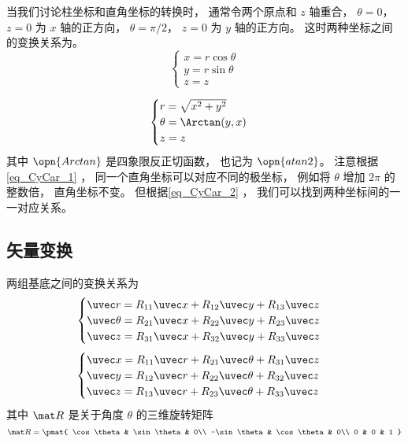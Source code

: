 

当我们讨论柱坐标和直角坐标的转换时， 通常令两个原点和 $z$ 轴重合， $\theta = 0$， $z = 0$ 为 $x$ 轴的正方向， $\theta = \pi/2$， $z = 0$ 为 $y$ 轴的正方向。 这时两种坐标之间的变换关系为。
\begin{equation}\label{eq_CyCar_1}
\begin{cases}
x = r\cos \theta \\
y = r\sin \theta  \\
z = z 
\end{cases}
\end{equation}

\begin{equation}\label{eq_CyCar_2}
\begin{cases}
r = \sqrt{x^2+y^2} \\
\theta = \Arctan(y,x)  \\
z = z 
\end{cases}
\end{equation}
其中 $\opn{Arctan}$ 是四象限反正切函数， 也记为 $\opn{atan2}$。 注意根据\autoref{eq_CyCar_1} ， 同一个直角坐标可以对应不同的极坐标， 例如将 $\theta$ 增加 $2\pi$ 的整数倍， 直角坐标不变。 但根据\autoref{eq_CyCar_2} ， 我们可以找到两种坐标间的一一对应关系。


\subsection{矢量变换}
两组基底之间的变换关系为
\begin{equation}\label{eq_CyCar_3}
\begin{cases}
\uvec r = R_{11}\uvec x + R_{12}\uvec y + R_{13}\uvec z\\
\uvec \theta = R_{21}\uvec x + R_{22}\uvec y + R_{23}\uvec z\\
\uvec z = R_{31}\uvec x + R_{32}\uvec y + R_{33}\uvec z
\end{cases}
\end{equation}
\begin{equation}\label{eq_CyCar_4}
\begin{cases}
\uvec x = R_{11} \uvec r + R_{21} \uvec \theta  + R_{31} \uvec z \\
\uvec y = R_{12} \uvec r + R_{22} \uvec \theta  + R_{32} \uvec z \\
\uvec z = R_{13} \uvec r + R_{23} \uvec \theta  + R_{33} \uvec z
\end{cases}
\end{equation}
其中 $\mat R$ 是关于角度 $\theta$ 的三维旋转矩阵
\begin{equation}
\mat R = \pmat{
    \cos\theta & \sin\theta & 0\\
    -\sin\theta & \cos\theta & 0\\
    0 & 0 & 1
}
\end{equation}

